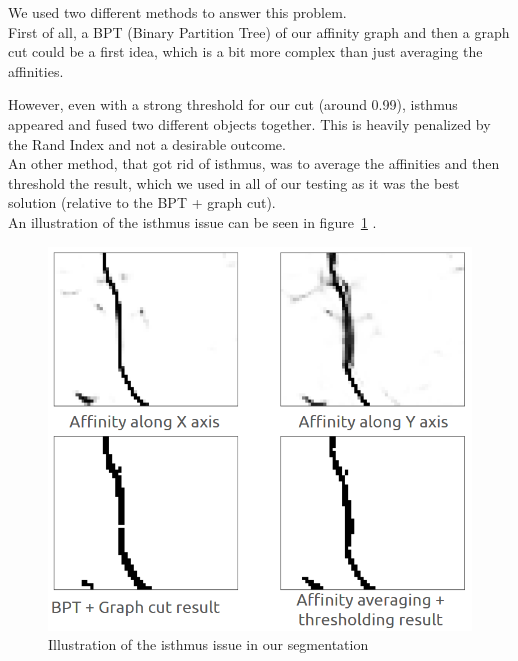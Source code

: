 We used two different methods to answer this problem.\\
First of all, a BPT (Binary Partition Tree) of our affinity graph and then a
graph cut could be a first idea, which is a bit more complex than just
averaging the affinities. 

However, even with a strong threshold for our cut (around 0.99), isthmus appeared and fused two different objects together.
This is heavily penalized by the Rand Index and not a desirable outcome.\\
An other method, that got rid of isthmus, was to average the affinities and
then threshold the result, which we used in all of our testing as it was the best solution
(relative to the BPT + graph cut).\\
An illustration of the isthmus issue can be seen in
figure~\ref{fig:cremi_isthmus} .


\begin{figure}[!htbp]
	\centering
	\includegraphics[width=0.6\linewidth]{./images/cremi_isthmus.png}
	\caption{Illustration of the isthmus issue in our segmentation}%
	\label{fig:cremi_isthmus}
\end{figure}

